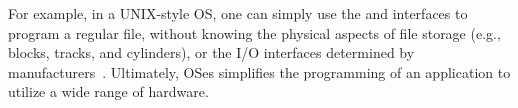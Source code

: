 For example, in a UNIX-style OS,
one can simply use the  and  interfaces
to program a regular file, without knowing the physical aspects of file storage (e.g., blocks, tracks, and cylinders),
or the I/O interfaces determined by manufacturers~\cite{ritchie78unix-retro}.
Ultimately, OSes simplifies the programming of an application
to utilize a wide range of hardware.



